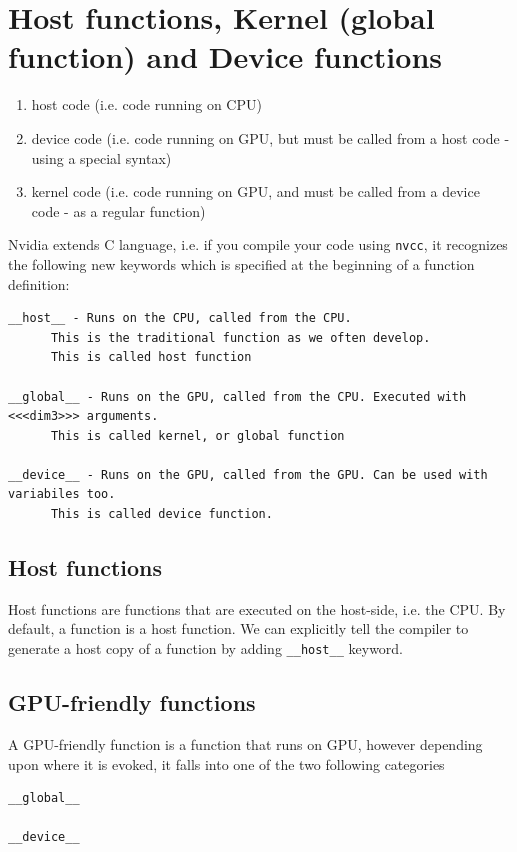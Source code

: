 \section{Host functions, Kernel (global function) and Device functions}

\begin{enumerate}
  \item host code (i.e. code running on CPU)
  
  \item device code (i.e. code running on GPU, but must be called from a host code - using a special syntax)
    
  \item kernel code (i.e. code running on GPU, and must be called from a device code - as a regular function)
\end{enumerate}

Nvidia extends C language, i.e. if you compile your code using \verb!nvcc!, it recognizes the following new 
keywords which is specified at the beginning of a function definition:

\begin{verbatim}
__host__ - Runs on the CPU, called from the CPU.
      This is the traditional function as we often develop.
      This is called host function

__global__ - Runs on the GPU, called from the CPU. Executed with <<<dim3>>> arguments.
      This is called kernel, or global function

__device__ - Runs on the GPU, called from the GPU. Can be used with variabiles too.
      This is called device function.
\end{verbatim}

\subsection{Host functions}
\label{sec:host-function}

Host functions are functions that are executed on the host-side, i.e. the CPU.
By default, a function is a host function.
We can explicitly tell the compiler to generate a host copy of a function by
adding \verb!__host__! keyword.

\subsection{GPU-friendly functions}
\label{sec:CUDA-friendly-functions}

A GPU-friendly function is a function that runs on GPU, however depending upon
where it is evoked, it falls into one of the two following categories
\begin{verbatim}
__global__

__device__
\end{verbatim}


